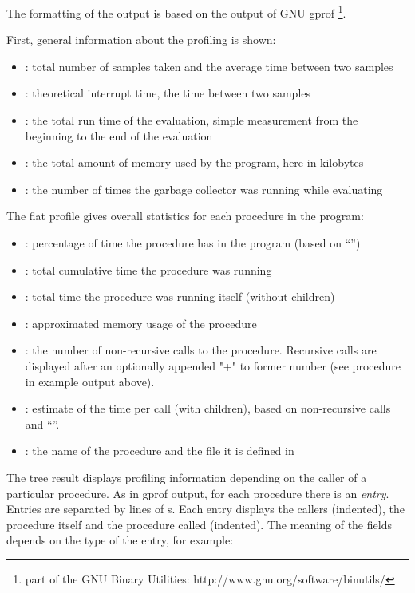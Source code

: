 The formatting of the output is based on the output of
GNU gprof \footnote{part of the GNU Binary Utilities: http://www.gnu.org/software/binutils/}.

First, general information about the profiling is shown:
\begin{itemize}
	\item {}: total number of samples taken and the
		average time between two samples
	\item {}: theoretical interrupt time, the time between
		two samples
	\item {}: the total run time of the evaluation, simple measurement
		from the beginning to the end of the evaluation
	\item {}: the total amount of memory used by the program, here in kilobytes
	\item {}: the number of times the garbage collector was running while evaluating
\end{itemize}

The flat profile gives overall statistics for each procedure in the program:
\begin{itemize}
\item {}:
	percentage of time the procedure has in the program (based on ``'')
\item {}:
	total cumulative time the procedure was running
\item {}:
	total time the procedure was running itself (without children)
\item {}:
	approximated memory usage of the procedure
\item {}:
	the number of non-recursive calls to the procedure. Recursive calls are displayed after an
	optionally appended "+" to former number (see procedure  in example output above).
\item {}:
	estimate of the time per call (with children), based on non-recursive calls and ``''.
\item {}:
	the name of the procedure and the file it is defined in
\end{itemize}

The tree result displays profiling information depending on the caller of a particular procedure.
As in gprof output, for each procedure there is an \textit{entry}. Entries are separated by lines of \code{=}s.
Each entry displays the callers (indented), the procedure itself and the procedure called (indented).
The meaning of the fields depends on the type of the entry, for example:

